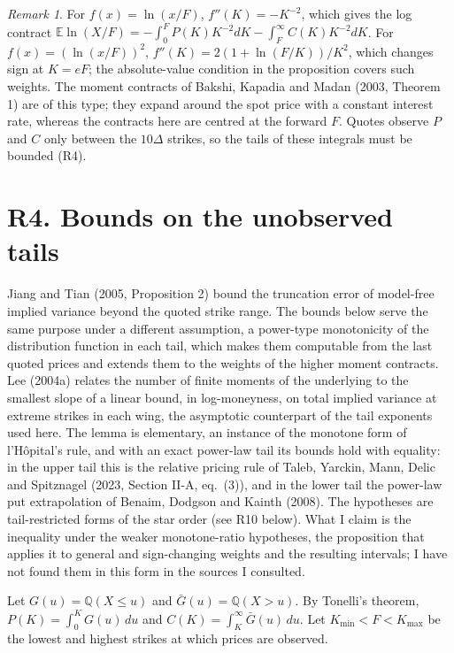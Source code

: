 \documentclass[11pt]{article}
\theoremstyle{remark}
\newtheorem{remark}[proposition]{Remark}
\newcommand{\E}{\mathbb{E}}
\newcommand{\Q}{\mathbb{Q}}
\begin{document}
\begin{remark}
For $f(x)=\ln(x/F)$, $f''(K)=-K^{-2}$, which gives the log contract $\E\ln(X/F)=-\int_0^F P(K)K^{-2}dK-\int_F^\infty C(K)K^{-2}dK$. For $f(x)=(\ln(x/F))^2$, $f''(K)=2(1+\ln(F/K))/K^2$, which changes sign at $K=eF$; the absolute-value condition in the proposition covers such weights. The moment contracts of Bakshi, Kapadia and Madan (2003, Theorem 1) are of this type; they expand around the spot price with a constant interest rate, whereas the contracts here are centred at the forward $F$. Quotes observe $P$ and $C$ only between the $10\Delta$ strikes, so the tails of these integrals must be bounded (R4).
\end{remark}

\section*{R4. Bounds on the unobserved tails}

Jiang and Tian (2005, Proposition 2) bound the truncation error of model-free implied variance beyond the quoted strike range. The bounds below serve the same purpose under a different assumption, a power-type monotonicity of the distribution function in each tail, which makes them computable from the last quoted prices and extends them to the weights of the higher moment contracts. Lee (2004a) relates the number of finite moments of the underlying to the smallest slope of a linear bound, in log-moneyness, on total implied variance at extreme strikes in each wing, the asymptotic counterpart of the tail exponents used here. The lemma is elementary, an instance of the monotone form of l'H\^opital's rule, and with an exact power-law tail its bounds hold with equality: in the upper tail this is the relative pricing rule of Taleb, Yarckin, Mann, Delic and Spitznagel (2023, Section II-A, eq.~(3)), and in the lower tail the power-law put extrapolation of Benaim, Dodgson and Kainth (2008). The hypotheses are tail-restricted forms of the star order (see R10 below). What I claim is the inequality under the weaker monotone-ratio hypotheses, the proposition that applies it to general and sign-changing weights and the resulting intervals; I have not found them in this form in the sources I consulted.

Let $G(u)=\Q(X\le u)$ and $\bar G(u)=\Q(X>u)$. By Tonelli's theorem, $P(K)=\int_0^K G(u)\,du$ and $C(K)=\int_K^\infty\bar G(u)\,du$. Let $K_{\min}<F<K_{\max}$ be the lowest and highest strikes at which prices are observed.
\end{document}

